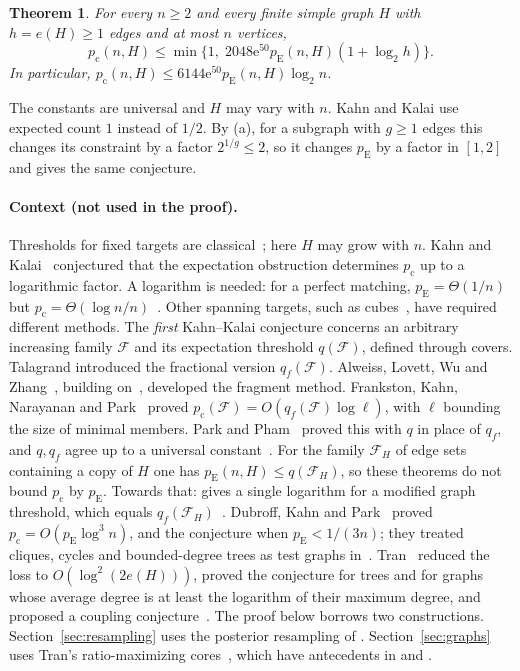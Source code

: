 \documentclass[11pt]{article}
\newtheorem{theorem}{Theorem}[section]
\numberwithin{equation}{section}
\newcommand{\pc}{p_{\mathrm c}}
\newcommand{\pE}{p_{\mathrm E}}
\newcommand{\ee}{\mathrm e}
\begin{document}
\begin{theorem}\label{thm:main}
For every $n\ge2$ and every finite simple graph $H$ with $h=e(H)\ge1$
edges and at most $n$ vertices,
\begin{equation}\label{eq:stronger}
 \pc(n,H)\le
 \min\{1,\;2048\ee^{50}\pE(n,H)(1+\log_2 h)\}.
\end{equation}
In particular, $\pc(n,H)\le6144\ee^{50}\pE(n,H)\log_2 n$.
\end{theorem}

The constants are universal and $H$ may vary with $n$. Kahn and Kalai use
expected count $1$ instead of $1/2$. By (a), for a subgraph with $g\ge1$ edges
this changes its constraint by a factor $2^{1/g}\le2$, so it changes $\pE$ by a
factor in $[1,2]$ and gives the same conjecture.

\paragraph{Context (not used in the proof).}
Thresholds for fixed targets are classical~\cite{ER60,Bollobas81}; here $H$ may
grow with $n$. Kahn and Kalai~\cite{KK07} conjectured that the expectation
obstruction determines $\pc$ up to a logarithmic factor. A logarithm is needed:
for a perfect matching, $\pE=\Theta(1/n)$ but
$\pc=\Theta(\log n/n)$~\cite{ER66,KK07}. Other spanning targets, such as
cubes~\cite{Riordan00}, have required different methods. The \emph{first}
Kahn--Kalai conjecture concerns an arbitrary increasing family $\mathcal F$ and
its expectation threshold $q(\mathcal F)$, defined through covers. Talagrand
\cite[Section~6]{Tal10} introduced the fractional version $q_f(\mathcal F)$.
Alweiss, Lovett, Wu and Zhang~\cite{ALWZ21}, building on~\cite{LSZ19}, developed
the fragment method. Frankston, Kahn, Narayanan and Park~\cite{FKNP21} proved
$p_{\mathrm c}(\mathcal F)=O(q_f(\mathcal F)\log\ell)$, with $\ell$ bounding the
size of minimal members. Park and Pham~\cite{PP24} proved this with $q$ in place
of $q_f$, and $q,q_f$ agree up to a universal
constant~\cite[Theorem~1.1]{OpenAIThresholdEquivalence2026}. For the family
$\mathcal F_H$ of edge sets containing a copy of $H$ one has
$\pE(n,H)\le q(\mathcal F_H)$, so these theorems do not bound $\pc$ by $\pE$.
Towards that: \cite[Theorem~1]{MNSZ22} gives a single logarithm for a modified
graph threshold, which equals $q_f(\mathcal F_H)$~\cite[Equation~(1)]{DKP25}.
Dubroff, Kahn and Park~\cite[Theorems~1.2--1.5]{DKP25} proved
$\pc=O(\pE\log^3n)$, and the conjecture when $\pE<1/(3n)$; they treated
cliques, cycles and bounded-degree trees as test graphs
in~\cite[Theorems~1.4--1.5]{DKP25Cases}. Tran~\cite{Tran26} reduced the loss to
$O(\log^2(2e(H)))$, proved the conjecture for trees and for graphs whose average
degree is at least the logarithm of their maximum degree, and proposed a
coupling conjecture~\cite[Section~4]{Tran26}. The proof below borrows two
constructions. Section~\ref{sec:resampling} uses the posterior resampling of
\cite{MNSZ25}. Section~\ref{sec:graphs} uses Tran's ratio-maximizing
cores~\cite[Section~3]{Tran26}, which have antecedents in
\cite[Claim~29]{LSZ19} and \cite[Lemma~2.4]{ALWZ21}.
\end{document}

